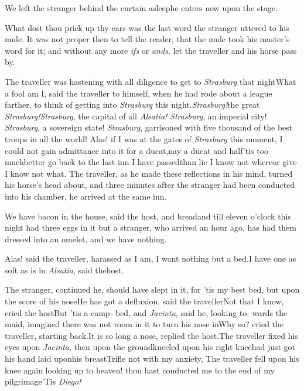 \documentclass{article}
\begin{document}
We left the stranger behind the curtain asleep\tsk he
enters now upon the stage.

\tsk What dost thou prick up thy ears \break
\tsk was the last word the stranger uttered
to his mule. It was not proper then to\break
tell the reader, that the mule took his\break
master’s word for it; and without any\break
more \textit{ifs} or \textit{ands}, let the
traveller and his horse pass by.

The traveller was hastening with all diligence to get to
\textit{Strasburg} that night\break\tsk What a fool am I, said the
traveller to himself, when he had rode about a league farther,
to think of getting into \textit{Strasburg} this
night.\tsk \textit{Strasburg!}\tsk the great
\textit{Strasburg!}\tsk \textit{Strasburg}, the capital of all
\textit{Alsatia!} \textit{Strasburg}, an imperial city!
\textit{Strasburg}, a sovereign state! \textit{Strasburg}, garrisoned
with five thousand of the best troops in all the world!\tsk
Alas!\break
if I was at the gates of \textit{Strasburg} this moment, I could not
gain admittance into it for a ducat,\tsk nay a ducat and
half\tsk ’tis too much\tsk better go back to the last inn
I have passed\tsk than lie I know not
where\tsk or give I know not what. The traveller, as he
made these reflections in his mind, turned his horse’s head
about, and three minutes after the stranger had been conducted into
his chamber, he arrived at the same inn.

\tsk We have bacon in the house, said the host, and
bread\tsh and till eleven o’clock this night had
three eggs in it\tsk{}
but a stranger, who arrived an hour
ago, has had them dressed into an omelet, and we have
nothing.\tsh

\tsk Alas! said the traveller, harassed as I am, I want nothing but a
bed.\tsh I have one as soft as is in \textit{Alsatia}, said
the\break host.

\tsk The stranger, continued he, should have slept in
it, for ’tis my best bed, but upon the score of his
nose\tsk He has got a defluxion, said the
traveller\tsk Not that 
I know, cried the host\tsk But ’tis a camp-\break 
bed, and \textit{Jacinta}, said he, looking to-\break 
wards the maid, imagined there was not room in
it to turn his nose in\tsk Why so? cried the traveller,
starting back.\tsk It is so long a nose, replied the
host.\tsk The traveller fixed his eyes upon
\textit{Jacinta}, then upon the ground\tsk kneeled upon his
right
knee\tsk had just got his hand laid upon\break his
breast\tsk Trifle not with my anxiety,
\break
\tsk The traveller fell
upon his knee again\tsk\break
{} 
looking up to heaven! thou hast conducted me to the end of
my pilgrimage\break\tsh ’Tis \textit{Diego!}
\end{document}
